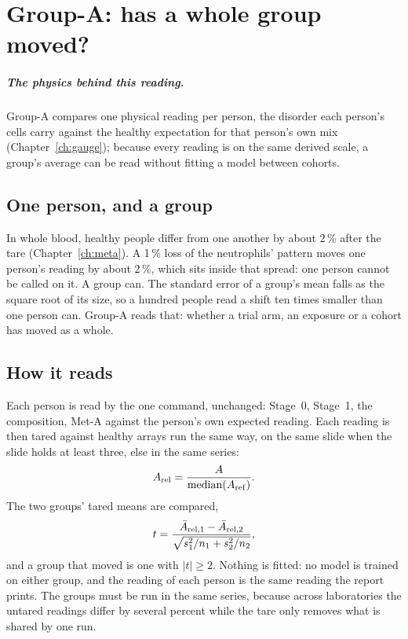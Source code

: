 \chapter{Group-A: has a whole group moved?}\label{ch:groupa}

\paragraph{The physics behind this reading.} Group-A compares one physical reading per person, the disorder each person's cells carry against the healthy expectation for that person's own mix (Chapter~\ref{ch:gauge}); because every reading is on the same derived scale, a group's average can be read without fitting a model between cohorts.

\section{One person, and a group}

In whole blood, healthy people differ from one another by about 2\,\% after the tare (Chapter~\ref{ch:meta}). A 1\,\% loss of the
neutrophils' pattern moves one person's reading by about 2\,\%, which sits inside that spread: one person cannot be called on it. A group can.
The standard error of a group's mean falls as the square root of its size, so a hundred people read a shift ten times smaller than one person
can. Group-A reads that: whether a trial arm, an exposure or a cohort has moved as a whole.

\section{How it reads}

Each person is read by the one command, unchanged: Stage~0, Stage~1, the composition, Met-A against the person's own expected reading.
Each reading is then tared against healthy arrays run the same way, on the same slide when the slide holds at least three, else in the same
series:
\begin{equation}
  A_{\rm rel}=\frac{A}{\mathrm{median}(A_{\rm ref})}.
  \label{eq:groupa_tare}
\end{equation}
The two groups' tared means are compared,
\begin{equation}
  t=\frac{\bar A_{\rm rel,1}-\bar A_{\rm rel,2}}{\sqrt{s_1^2/n_1+s_2^2/n_2}},
  \label{eq:groupa_t}
\end{equation}
and a group that moved is one with $|t|\ge 2$. Nothing is fitted: no model is trained on either group, and the reading of each person is
the same reading the report prints. The groups must be run in the same series, because across laboratories the untared readings differ by
several percent while the tare only removes what is shared by one run. \measured{}


